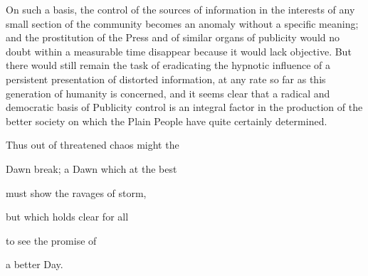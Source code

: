 \documentclass{book}
\begin{document}
On such a basis, the control of the sources of information in the interests of any small section of the community becomes an anomaly without a specific meaning; and the prostitution of the Press and of similar organs of publicity would no doubt within a measurable time disappear because it would lack objective. But there would still remain the task of eradicating the hypnotic influence of a persistent presentation of distorted information, at any rate so far as this generation of humanity is concerned, and it seems clear that a radical and democratic basis of Publicity control is an integral factor in the production of the better society on which the Plain People have quite certainly determined.

Thus out of threatened chaos might the

Dawn break; a Dawn which at the best

must show the ravages of storm,

but which holds clear for all

to see the promise of

a better Day.
\end{document}
